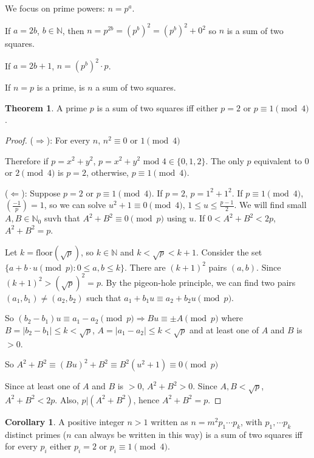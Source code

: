 \documentclass[12pt,a4paper]{article}
\theoremstyle{definition}
\newtheorem{theorem}[definition]{Theorem}
\newtheorem{corollary}[definition]{Corollary}
\begin{document}
We focus on prime powers: $n = p^a$.

If $a = 2b$, $b \in \mathbb{N}$, then $n = p^{2b} = (p^b)^2 = (p^b)^2 + 0^2$ so $n$ is a sum of two squares.

If $a = 2b + 1$, $n = (p^b)^2 \cdot p$.

If $n = p$ is a prime, is $n$ a sum of two squares.

\begin{theorem}
	A prime $p$ is a sum of two squares iff either $p = 2$ or $p \equiv 1 \pmod{4}$.
\end{theorem}

\begin{proof}
	($\Rightarrow$):
	For every $n$, $n^2 \equiv 0 \text{ or } 1 \pmod{4}$

	Therefore if $p = x^2 + y^2$, $p = x^2 + y^2 \text{ mod } 4 \in \{0, 1, 2\}$. The only $p$ equivalent to $0$ or $2 \pmod{4}$ is $p = 2$, otherwise, $p \equiv 1 \pmod{4}$.

	($\Leftarrow$):
	Suppose $p = 2$ or $p \equiv 1 \pmod{4}$. If $p = 2$, $p = 1^2 + 1^2$. If $p \equiv 1 \pmod{4}$, $\left(\frac{-1}{p}\right) = 1$, so we can solve $u^2 + 1 \equiv 0 \pmod{4}$, $1 \le u \le \frac{p - 1}{2}$. We will find small $A, B \in \mathbb{N}_0$ suvh that $A^2 + B^2 \equiv 0 \pmod{p}$ using $u$. If $0 < A^2 + B^2 < 2p$, $A^2 + B^2 = p$.

	Let $k = \text{floor}(\sqrt{p})$, so $k \in \mathbb{N}$ and $k < \sqrt{p} < k + 1$. Consider the set $\{a + b \cdot u \pmod{p}: 0 \le a, b \le k\}$. There are $(k + 1)^2$ pairs $(a, b)$. Since $(k + 1)^2 > (\sqrt{p})^2 = p$. By the pigeon-hole principle, we can find two pairs $(a_1, b_1) \ne (a_2, b_2)$ such that $a_1 + b_1 u \equiv a_2 + b_2 u \pmod{p}$.

	So $(b_2 - b_1) u \equiv a_1 - a_2 \pmod{p} \Rightarrow B u \equiv \pm A \pmod{p}$ where $B = |b_2 - b_1| \le k < \sqrt{p}$, $A = |a_1 - a_2| \le k < \sqrt{p}$ and at least one of $A$ and $B$ is $> 0$.

	So $A^2 + B^2 \equiv (B u)^2 + B^2 \equiv B^2 (u^2 + 1) \equiv 0 \pmod{p}$

	Since at least one of $A$ and $B$ is $> 0$, $A^2 + B^2 > 0$. Since $A, B < \sqrt{p}$, $A^2 + B^2 < 2p$. Also, $p | (A^2 + B^2)$, hence $A^2 + B^2 = p$.
\end{proof}

\begin{corollary}
	A positive integer $n > 1$ written as $n = m^2 p_1 \cdots p_k$, with $p_1, \cdots p_k$ distinct primes ($n$ can always be written in this way) is a sum of two squares iff for every $p_i$ either $p_i = 2$ or $p_i \equiv 1 \pmod{4}$.
\end{corollary}
\end{document}
